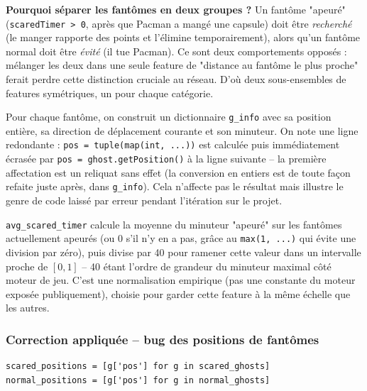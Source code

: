 \documentclass[a4paper,12pt]{article}
\begin{document}
\textbf{Pourquoi séparer les fantômes en deux groupes ?} Un fantôme
"apeuré" (\texttt{scaredTimer > 0}, après que Pacman a mangé une capsule)
doit être \emph{recherché} (le manger rapporte des points et l'élimine
temporairement), alors qu'un fantôme normal doit être \emph{évité} (il
tue Pacman). Ce sont deux comportements opposés : mélanger les deux dans
une seule feature de "distance au fantôme le plus proche" ferait perdre
cette distinction cruciale au réseau. D'où deux sous-ensembles de features
symétriques, un pour chaque catégorie.

Pour chaque fantôme, on construit un dictionnaire \texttt{g\_info} avec sa
position entière, sa direction de déplacement courante et son minuteur.
On note une ligne redondante : \texttt{pos = tuple(map(int, ...))} est
calculée puis immédiatement écrasée par \texttt{pos = ghost.getPosition()}
à la ligne suivante -- la première affectation est un reliquat sans effet
(la conversion en entiers est de toute façon refaite juste après, dans
\texttt{g\_info}). Cela n'affecte pas le résultat mais illustre le genre
de code laissé par erreur pendant l'itération sur le projet.

\texttt{avg\_scared\_timer} calcule la moyenne du minuteur "apeuré" sur
les fantômes actuellement apeurés (ou 0 s'il n'y en a pas, grâce au
\texttt{max(1, ...)} qui évite une division par zéro), puis divise par 40
pour ramener cette valeur dans un intervalle proche de $[0, 1]$ -- 40
étant l'ordre de grandeur du minuteur maximal côté moteur de jeu. C'est
une normalisation empirique (pas une constante du moteur exposée
publiquement), choisie pour garder cette feature à la même échelle que
les autres.

\subsubsection{Correction appliquée -- bug des positions de fantômes}
\label{sec:bug-ghost}

\begin{lstlisting}
scared_positions = [g['pos'] for g in scared_ghosts]
normal_positions = [g['pos'] for g in normal_ghosts]
\end{lstlisting}
\end{document}
